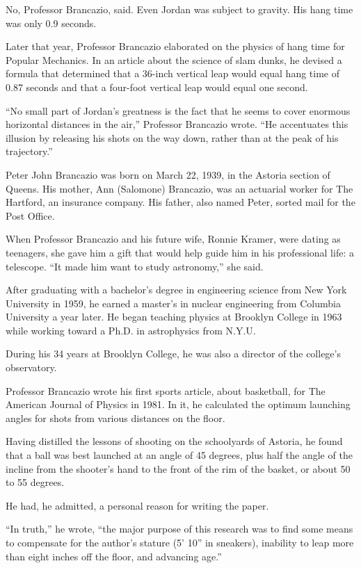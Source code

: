 No, Professor Brancazio, said. Even Jordan was subject to gravity. His
hang time was only 0.9 seconds.

Later that year, Professor Brancazio elaborated on the physics of hang
time for Popular Mechanics. In an article about the science of slam
dunks, he devised a formula that determined that a 36-inch vertical leap
would equal hang time of 0.87 seconds and that a four-foot vertical leap
would equal one second.

``No small part of Jordan's greatness is the fact that he seems to cover
enormous horizontal distances in the air,'' Professor Brancazio wrote.
``He accentuates this illusion by releasing his shots on the way down,
rather than at the peak of his trajectory.''

Peter John Brancazio was born on March 22, 1939, in the Astoria section
of Queens. His mother, Ann (Salomone) Brancazio, was an actuarial worker
for The Hartford, an insurance company. His father, also named Peter,
sorted mail for the Post Office.

When Professor Brancazio and his future wife, Ronnie Kramer, were dating
as teenagers, she gave him a gift that would help guide him in his
professional life: a telescope. ``It made him want to study astronomy,''
she said.

After graduating with a bachelor's degree in engineering science from
New York University in 1959, he earned a master's in nuclear engineering
from Columbia University a year later. He began teaching physics at
Brooklyn College in 1963 while working toward a Ph.D. in astrophysics
from N.Y.U.

During his 34 years at Brooklyn College, he was also a director of the
college's observatory.

Professor Brancazio wrote his first sports article, about basketball,
for The American Journal of Physics in 1981. In it, he calculated the
optimum launching angles for shots from various distances on the floor.

Having distilled the lessons of shooting on the schoolyards of Astoria,
he found that a ball was best launched at an angle of 45 degrees, plus
half the angle of the incline from the shooter's hand to the front of
the rim of the basket, or about 50 to 55 degrees.

He had, he admitted, a personal reason for writing the paper.

``In truth,'' he wrote, ``the major purpose of this research was to find
some means to compensate for the author's stature (5' 10'' in sneakers),
inability to leap more than eight inches off the floor, and advancing
age.''

